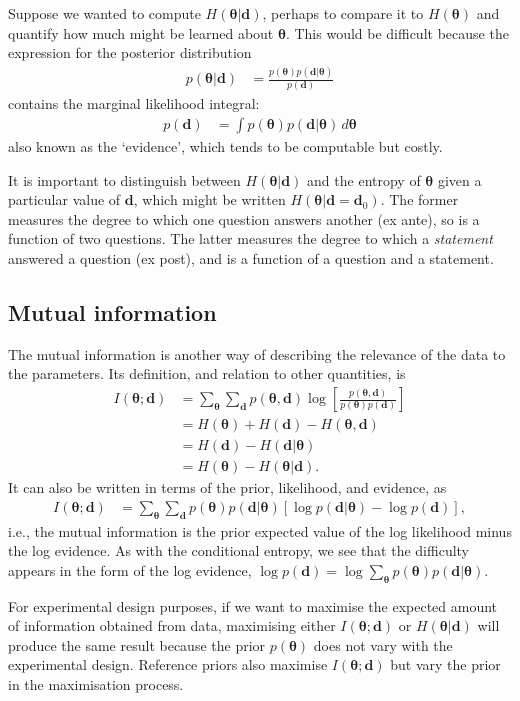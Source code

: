 \documentclass[entropy,article,accept,oneauthor,pdftex,10pt,a4paper]{mdpi}
\renewcommand{\d}{\boldsymbol{d}}
\newcommand{\x}{\boldsymbol{\theta}}
\begin{document}
Suppose we wanted to compute $H(\x | \d)$, perhaps to compare it to
$H(\x)$ and quantify how much might be learned about $\x$.
This would be difficult because the expression
for the posterior distribution
\begin{align}
p(\x | \d) &= \frac{p(\x)p(\d | \x)}{p(\d)}
\end{align}
contains the marginal likelihood integral:
\begin{align}
p(\d) &= \int p(\x) p(\d | \x) \, d\x
\end{align}
also known as the `evidence', which tends to be computable but costly.

It is important to distinguish between $H(\x | \d)$ and the
entropy of $\x$ given a particular value of $\d$, which might be written
$H(\x | \d=\d_0)$.
The former measures the degree to which one question answers
another (ex ante), so is a function of two questions. The latter measures the
degree to which a {\em statement} answered a question (ex post),
and is a function of a question and a statement.

\subsection{Mutual information}
The mutual information is another way of describing the relevance of the
data to the parameters. Its definition, and relation to other quantities, is
\begin{align}
I(\x; \d) &= \sum_{\x} \sum_{\d} p(\x, \d)
                       \log\left[\frac{p(\x, \d)}{p(\x)p(\d)}\right]\\
           &= H(\x) + H(\d) - H(\x, \d)\\
           &= H(\d) - H(\d | \x)\\
           &= H(\x) - H(\x | \d).
\end{align}
It can also be written in terms of the prior, likelihood, and evidence,
as
\begin{align}
I(\x; \d) &= \sum_{\x} \sum_{\d} p(\x)p(\d | \x)
              \left[\log p(\d | \x) - \log p(\d)\right],
\end{align}
i.e., the mutual information is the prior expected value of the
log likelihood minus the log evidence.
As with the conditional entropy, we see that the difficulty appears in the
form of the log evidence,
$\log p(\d) = \log \sum_{\x} p(\x)p(\d | \x)$.

For experimental design purposes, if we want to maximise the expected amount
of information obtained from data, maximising either $I(\x; \d)$ or
$H(\x | \d)$ will produce the same result because the prior $p(\x)$ does not
vary with the experimental design. Reference priors
\citep{bernardo2005reference} also maximise $I(\x; \d)$ but vary the prior
in the maximisation process.
\end{document}
